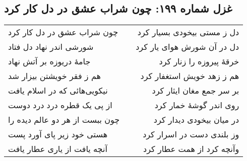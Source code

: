 \begin{center}
\section*{غزل شماره ۱۹۹: چون شراب عشق در دل کار کرد}
\label{sec:199}
\begin{longtable}{l p{0.5cm} r}
چون شراب عشق در دل کار کرد
&&
دل ز مستی بیخودی بسیار کرد
\\
شورشی اندر نهاد دل فتاد
&&
دل در آن شورش هوای یار کرد
\\
جامهٔ دریوزه بر آتش نهاد
&&
خرقهٔ پیروزه را زنار کرد
\\
هم ز فقر خویشتن بیزار شد
&&
هم ز زهد خویش استغفار کرد
\\
نیکویی‌هائی که در اسلام یافت
&&
بر سر جمع مغان ایثار کرد
\\
از پی یک قطره درد درد دوست
&&
روی اندر گوشهٔ خمار کرد
\\
چون ببست از هر دو عالم دیده را
&&
در میان بیخودی دیدار کرد
\\
هستی خود زیر پای آورد پست
&&
وز بلندی دست در اسرار کرد
\\
آنچه یافت از یاری عطار یافت
&&
وآنچه کرد از همت عطار کرد
\\
\end{longtable}
\end{center}
